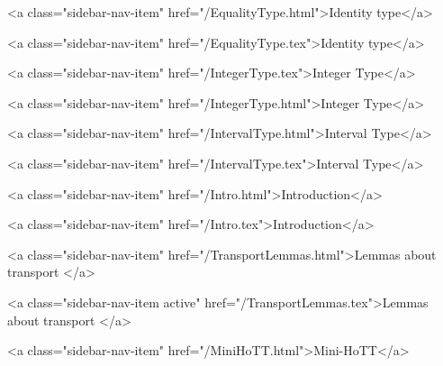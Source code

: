       
        
          <a class="sidebar-nav-item" href="/EqualityType.html">Identity type</a>
        
      
    
      
        
          <a class="sidebar-nav-item" href="/EqualityType.tex">Identity type</a>
        
      
    
      
        
          <a class="sidebar-nav-item" href="/IntegerType.tex">Integer Type</a>
        
      
    
      
        
          <a class="sidebar-nav-item" href="/IntegerType.html">Integer Type</a>
        
      
    
      
        
          <a class="sidebar-nav-item" href="/IntervalType.html">Interval Type</a>
        
      
    
      
        
          <a class="sidebar-nav-item" href="/IntervalType.tex">Interval Type</a>
        
      
    
      
        
          <a class="sidebar-nav-item" href="/Intro.html">Introduction</a>
        
      
    
      
        
          <a class="sidebar-nav-item" href="/Intro.tex">Introduction</a>
        
      
    
      
        
          <a class="sidebar-nav-item" href="/TransportLemmas.html">Lemmas about transport </a>
        
      
    
      
        
          <a class="sidebar-nav-item active" href="/TransportLemmas.tex">Lemmas about transport </a>
        
      
    
      
        
          <a class="sidebar-nav-item" href="/MiniHoTT.html">Mini-HoTT</a>
        
      
    
